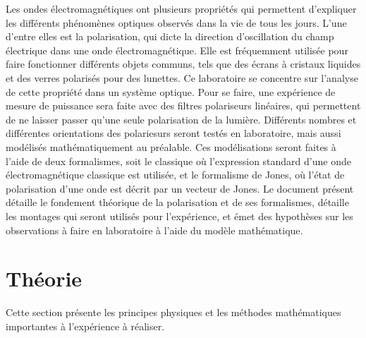 \documentclass[11pt,letterpaper]{article}
\begin{document}
Les ondes électromagnétiques ont plusieurs propriétés qui permettent d'expliquer les différents
phénomènes optiques observés dans la vie de tous les jours. L'une d'entre elles est la polarisation,
qui dicte la direction d'oscillation du champ électrique dans une onde électromagnétique. Elle
est fréquemment utilisée pour faire fonctionner différents objets communs, tels que des écrans à
cristaux liquides et des verres polarisés pour des lunettes. Ce laboratoire se concentre sur l'analyse
de cette propriété dans un système optique. Pour se faire, une expérience de mesure de puissance sera
faite avec des filtres polariseurs linéaires, qui permettent de ne laisser passer qu'une seule polarisation de
la lumière. Différents nombres et différentes orientations des polariesurs seront testés en laboratoire, mais
aussi modélisés mathématiquement au préalable. Ces modélisations seront faites à l'aide de deux formalismes, soit
le classique où l'expression standard d'une onde électromagnétique classique est utilisée, et le formalisme de
Jones, où l'état de polarisation d'une onde est décrit par un vecteur de Jones. Le document présent détaille
le fondement théorique de la polarisation et de ses formalismes, détaille les montages qui seront utilisés
pour l'expérience, et émet des hypothèses sur les observations à faire en laboratoire à l'aide du modèle
mathématique.

\section{Théorie}\label{theo}
Cette section présente les principes physiques et les méthodes mathématiques importantes à l'expérience à réaliser.
\end{document}
